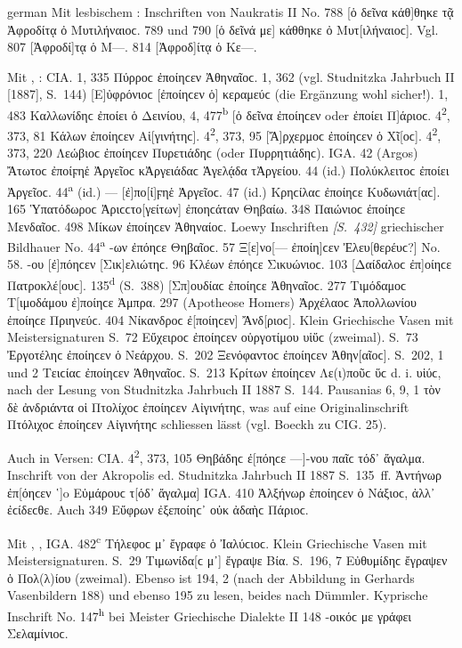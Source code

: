 \begin{otherlanguage*}{german}
Mit lesbischem : Inschriften von Naukratis II No. 788 [ὁ δεῖνα κάθ]θη\-κε τᾷ Ἀφροδίτᾳ ὀ Μυτιλήναιοϲ. 789 und 790 [ὁ δεῖνά με] κάθθηκε ὀ Μυ\-τ[ι\-λή\-ναι\-οϲ]. Vgl. 807 [Ἀφροδί]τᾳ ὁ Μ—. 814 [Ἀφροδ]ίτᾳ ὁ Κε—.

Mit , : CΙΑ. 1, 335 Πύρροϲ ἐποίηϲεν Ἀθηναῖοϲ. 1, 362 (vgl. Stud\-nitz\-ka Jahrbuch II [1887], S.~144) [Ε]ὐφρόνιοϲ [ἐποίηϲεν ὁ] κεραμεύϲ (die Ergänzung wohl sicher!). 1, 483 Καλλωνίδηϲ ἐποίει ὁ Δεινίου, 4, 477\textsuperscript{b} [ὁ δεῖνα ἐποίηϲεν oder ἐποίει Π]άριοϲ. 4\textsuperscript{2}, 373, 81 Κάλων ἐποίηϲεν Αἱ[γινήτηϲ]. 4\textsuperscript{2}, 373, 95 [Ἄ]ρχερμοϲ ἐποίηϲεν ὁ Χῖ[οϲ]. 4\textsuperscript{2}, 373, 220 Λεώβιοϲ ἐποίηϲεν Πυρετιάδηϲ (oder Πυρρητιάδηϲ). IGA. 42 (Argos) Ἄτωτοϲ ἐποίϝηἑ Ἀργεῖοϲ κἈργειάδαϲ Ἁγελᾴδα τἈργείου. 44 (id.) Πολύκλειτοϲ ἐποίει Ἀργεῖοϲ. 44\textsuperscript{a} (id.) — [ἐ]πο[ί]ϝηἑ Ἀργεῖοϲ. 47 (id.) Κρηϲί\-λαϲ ἐποίηϲε Κυδωνιάτ[αϲ]. 165 Ὑπατόδωροϲ Ἀριϲϲτο[γείτων] ἐποη\-ϲά\-ταν Θηβαίω. 348 Παιώνιοϲ ἐποίηϲε Μενδαῖοϲ. 498 Μίκων ἐποίηϲεν Ἀθη\-ναί\-οϲ. Loewy Inschriften \hypertarget{p432}{\emph{[S.~432]}}\label{p432} griechischer Bildhauer No. 44\textsuperscript{a} -ων ἐπόηϲε Θηβαῖοϲ. 57 Ξ[ε]νο[— ἐποίη]ϲεν Ἐλευ[θερέυϲ?] No. 58. -ου [ἐ]πόηϲεν [Σικ]ε\-λι\-ώ\-τηϲ. 96 Κλέων ἐπόηϲε Σικυώνιοϲ. 103 [Δαίδαλοϲ ἐπ]οίηϲε Πατροκλέ[ουϲ]. 135\textsuperscript{d} (S.~388) [Σπ]ουδίαϲ ἐποίη\-ϲε Ἀθηναῖοϲ. 277 Τιμόδαμοϲ Τ[ιμοδάμου ἐ]ποίηϲε Ἀμπρα. 297 (Apotheose Homers) Ἀρχέλαοϲ Ἀπολλωνίου ἐποίηϲε Πρι\-η\-νεύϲ. 404 Νίκαν\-δροϲ ἐ[ποίηϲεν] Ἄνδ[ριοϲ]. Klein Griechische Vasen mit Meistersignaturen S.~72 Εὔχειροϲ ἐποίηϲεν οὑργοτίμου υἱὕϲ (zweimal). S.~73 Ἐργοτέληϲ ἐποίηϲεν ὁ Νεάρχου. S.~202 Ξενό\-φαν\-τοϲ ἐποίηϲεν Ἀθην[αῖοϲ]. S.~202, 1 und 2 Τειϲίαϲ ἐποίηϲεν Ἁθηναῖοϲ. S.~213 Κρίτων ἐποίηϲεν Λε(ι)ποῦϲ ὕϲ d. i. υἱύϲ, nach der Lesung von Studnitzka Jahrbuch II 1887 S.~144. Pausanias 6, 9, 1 τὸν δὲ ἀνδριάντα οἱ Πτολίχοϲ ἐποίηϲεν Αἰγινήτηϲ, was auf eine Originalinschrift Πτόλιχοϲ ἐποίηϲεν Αἰγινήτηϲ schliessen lässt (vgl. Boeckh zu CIG. 25).

Auch in Versen: CIA. 4\textsuperscript{2}, 373, 105 Θηβάδηϲ ἐ[πόηϲε —]-νου παῖϲ τόδ᾽ ἄγαλμα. Inschrift von der Akropolis ed. Studnitzka Jahrbuch II 1887 S.~135~ff. Ἀντήνωρ ἐπ[όηϲεν ῾]o Εὐμάρουϲ τ[όδ᾽ ἄγαλμα] IGA. 410 Ἀλξήνωρ ἐποίηϲεν ὁ Νάξιοϲ, ἀλλ᾽ ἐϲίδεϲθε. Auch 349 Εὔφρων ἐξεποίηϲ᾽ οὐκ ἀδαὴϲ Πάριοϲ.

Mit , ,  IGA. 482\textsuperscript{c} Τήλεφοϲ μ᾽ ἔγραφε ὁ Ἰαλύϲιοϲ. Klein Griechische Vasen mit Meistersignaturen. S.~29 Τιμωνίδα[ϲ μ᾽] ἔγραψε Βία. S.~196, 7 Εὐθυμίδηϲ ἔγραψεν ὁ Πολ(λ)ίου (zweimal). Ebenso ist 194, 2 (nach der Abbildung in Gerhards Vasenbildern 188) und ebenso 195 zu lesen, beides nach Dümmler. Kyprische Inschrift No. 147\textsuperscript{h} bei Meister Griechische Dialekte II 148 -οικόϲ με γράφει Σελαμίνιοϲ.


\end{otherlanguage*}
